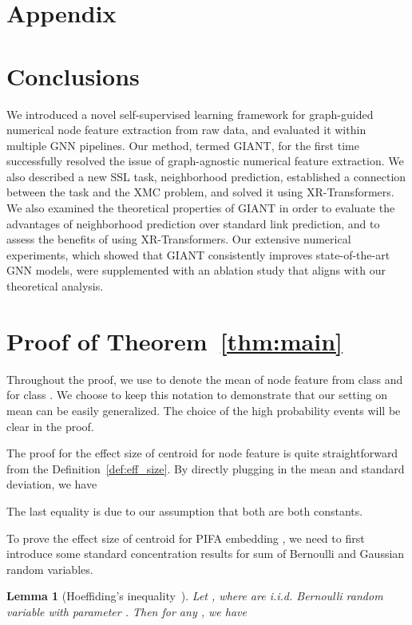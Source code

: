 \documentclass{article} \usepackage{iclr2022_conference,times}
\newtheorem{lemma}[theorem]{Lemma}
\begin{document}




\clearpage
\appendix
\section*{Appendix}
\section{Conclusions}
We introduced a novel self-supervised learning framework for graph-guided numerical node feature extraction from raw data, and evaluated it within multiple GNN pipelines. Our method, termed GIANT, for the first time successfully resolved the issue of graph-agnostic numerical feature extraction. We also described a new SSL task, neighborhood prediction, established a connection between the task and the XMC problem, and solved it using XR-Transformers. We also examined the theoretical properties of GIANT in order to evaluate the advantages of neighborhood prediction over standard link prediction, and to assess the benefits of using XR-Transformers. Our extensive numerical experiments, which showed that GIANT consistently improves state-of-the-art GNN models, were supplemented with an ablation study that aligns with our theoretical analysis.

\section{Proof of Theorem~\ref{thm:main}}


Throughout the proof, we use  to denote the mean of node feature from class  and  for class . We choose to keep this notation to demonstrate that our setting on mean can be easily generalized. The choice of the high probability events will be clear in the proof.

The proof for the effect size of centroid for node feature  is quite straightforward from the Definition~\ref{def:eff_size}. By directly plugging in the mean and standard deviation, we have

The last equality is due to our assumption that both  are both constants.

To prove the effect size of centroid for PIFA embedding , we need to first introduce some standard concentration results for sum of Bernoulli and Gaussian random variables.

\begin{lemma}	[Hoeffiding's inequality~\citep{hoeffding1994probability}]\label{lma:Hoeffding}
	Let , where  are i.i.d. Bernoulli random variable with parameter . Then for any , we have
	
\end{lemma}
\end{document}
